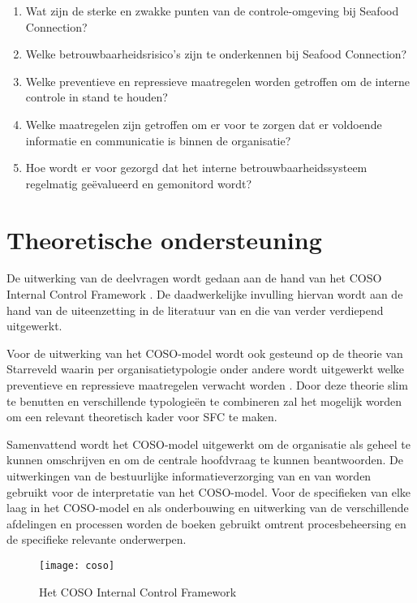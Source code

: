 \begin{enumerate}
    \item Wat zijn de sterke en zwakke punten van de controle-omgeving bij Seafood Connection?
    \item Welke betrouwbaarheidsrisico's zijn te onderkennen bij Seafood Connection?
    \item Welke preventieve en repressieve maatregelen worden getroffen om de interne controle in stand te houden?
    \item Welke maatregelen zijn getroffen om er voor te zorgen dat er voldoende informatie en communicatie is binnen de organisatie?
    \item Hoe wordt er voor gezorgd dat het interne betrouwbaarheidssysteem regelmatig geëvalueerd en gemonitord wordt?
\end{enumerate}
\section{Theoretische ondersteuning}
De uitwerking van de deelvragen wordt gedaan aan de hand van het COSO Internal Control Framework \citep{COSOsummery}. De daadwerkelijke invulling hiervan wordt aan de hand van de uiteenzetting in de literatuur van \citet{bivpraktijk} en die van \citet{bivperspectief} verder verdiepend uitgewerkt. 

Voor de uitwerking van het COSO-model wordt ook gesteund op de theorie van Starreveld waarin per organisatietypologie onder andere wordt uitgewerkt welke preventieve en repressieve maatregelen verwacht worden \citep{jans,financiering,buunk}. Door deze theorie slim te benutten en verschillende typologieën te combineren zal het mogelijk worden om een relevant theoretisch kader voor SFC te maken. 

Samenvattend wordt het COSO-model uitgewerkt om de organisatie als geheel te kunnen omschrijven en om de centrale hoofdvraag te kunnen beantwoorden. De uitwerkingen van de bestuurlijke informatieverzorging van \citet{bivperspectief} en van \citet{bivpraktijk} worden gebruikt voor de interpretatie van het COSO-model. Voor de specifieken van elke laag in het COSO-model en als onderbouwing en uitwerking van de verschillende afdelingen en processen worden de boeken gebruikt omtrent procesbeheersing en de specifieke relevante onderwerpen. \citep{internebeheersing,jans,financiering,buunk}

\begin{figure}[!h]
    \centering
    \texttt{[image: coso]}
    \caption{Het COSO Internal Control Framework \citep{COSOsummery}}
    \label{fig:coso}
\end{figure}

